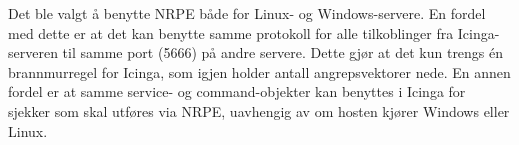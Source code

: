 Det ble valgt å benytte NRPE både for Linux- og Windows-servere. En fordel med dette er at det kan benytte samme protokoll for alle tilkoblinger fra Icinga-serveren til samme port (5666) på andre servere. Dette gjør at det kun trengs én brannmurregel for Icinga, som igjen holder antall angrepsvektorer nede. En annen fordel er at samme service- og command-objekter kan benyttes i Icinga for sjekker som skal utføres via NRPE, uavhengig av om hosten kjører Windows eller Linux.


